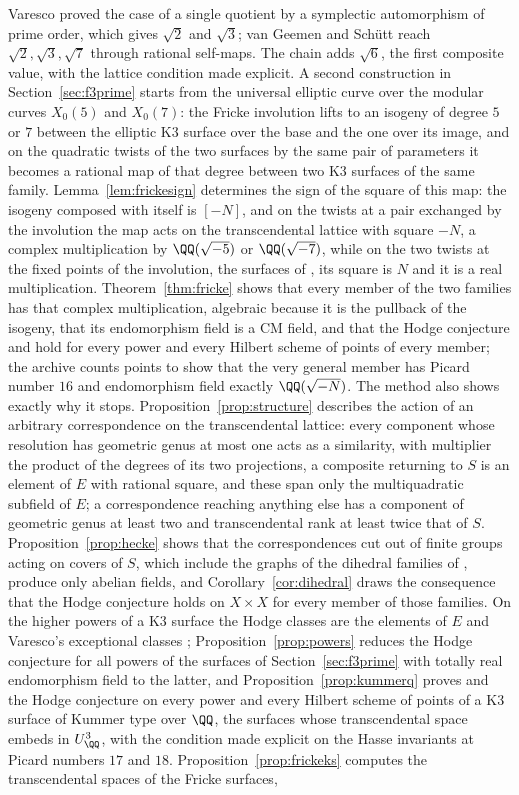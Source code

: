 Varesco \cite{Var23} proved the case of a single quotient by a symplectic automorphism of prime order, which gives $\sqrt2$ and $\sqrt3$; van Geemen and Sch\"utt \cite{vGS25} reach $\sqrt2,\sqrt3,\sqrt7$ through rational self-maps. The chain adds $\sqrt6$, the first composite value, with the lattice condition made explicit. A second construction in Section~\ref{sec:f3prime} starts from the universal elliptic curve over the modular curves $X_{0}(5)$ and $X_{0}(7)$: the Fricke involution lifts to an isogeny of degree $5$ or $7$ between the elliptic K3 surface over the base and the one over its image, and on the quadratic twists of the two surfaces by the same pair of parameters it becomes a rational map of that degree between two K3 surfaces of the same family. Lemma~\ref{lem:frickesign} determines the sign of the square of this map: the isogeny composed with itself is $[-N]$, and on the twists at a pair exchanged by the involution the map acts on the transcendental lattice with square $-N$, a complex multiplication by $\QQ(\sqrt{-5})$ or $\QQ(\sqrt{-7})$, while on the two twists at the fixed points of the involution, the surfaces of \cite{vGS25}, its square is $N$ and it is a real multiplication. Theorem~\ref{thm:fricke} shows that every member of the two families has that complex multiplication, algebraic because it is the pullback of the isogeny, that its endomorphism field is a CM field, and that the Hodge conjecture and \Fiii{} hold for every power and every Hilbert scheme of points of every member; the archive counts points to show that the very general member has Picard number $16$ and endomorphism field exactly $\QQ(\sqrt{-N})$. The method also shows exactly why it stops. Proposition~\ref{prop:structure} describes the action of an arbitrary correspondence on the transcendental lattice: every component whose resolution has geometric genus at most one acts as a similarity, with multiplier the product of the degrees of its two projections, a composite returning to $S$ is an element of $E$ with rational square, and these span only the multiquadratic subfield of $E$; a correspondence reaching anything else has a component of geometric genus at least two and transcendental rank at least twice that of $S$. Proposition~\ref{prop:hecke} shows that the correspondences cut out of finite groups acting on covers of $S$, which include the graphs of the dihedral families of \cite{vGS25}, produce only abelian fields, and Corollary~\ref{cor:dihedral} draws the consequence that the Hodge conjecture holds on $X\times X$ for every member of those families. On the higher powers of a K3 surface the Hodge classes are the elements of $E$ and Varesco's exceptional classes \cite{Var25}; Proposition~\ref{prop:powers} reduces the Hodge conjecture for all powers of the surfaces of Section~\ref{sec:f3prime} with totally real endomorphism field to the latter, and Proposition~\ref{prop:kummerq} proves \Fiii{} and the Hodge conjecture on every power and every Hilbert scheme of points of a K3 surface of Kummer type over $\QQ$, the surfaces whose transcendental space embeds in $U_{\QQ}^{3}$, with the condition made explicit on the Hasse invariants at Picard numbers $17$ and $18$. Proposition~\ref{prop:frickeks} computes the transcendental spaces of the Fricke surfaces, 